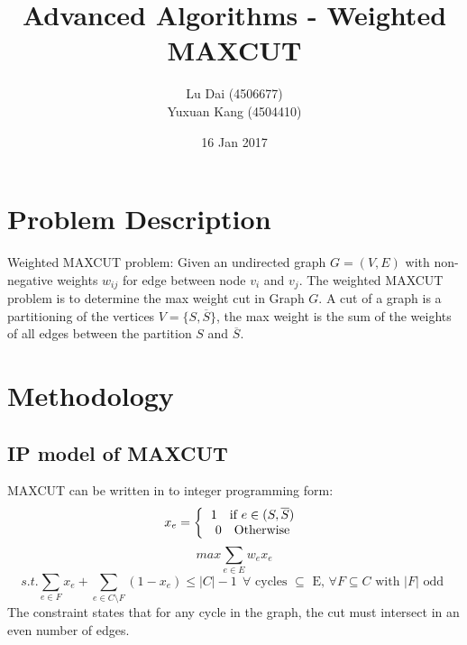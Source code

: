 \documentclass[11pt]{article}
\title{\textbf{Advanced Algorithms - Weighted MAXCUT}}
\author{Lu Dai (4506677)\\
		Yuxuan Kang (4504410)\\}
\date{16 Jan 2017}
\begin{document}
\maketitle

\section{Problem Description}
Weighted MAXCUT problem:
Given an undirected graph $G=(V,E)$ with non-negative weights $w_{ij}$ for edge between node $v_i$ and $v_j$. The weighted MAXCUT problem is to determine the max weight cut in Graph $G$. A cut of a graph is a partitioning of the vertices $V=\{S,\overline{S}\}$, the max weight is the sum of the weights of all edges between the partition $S$ and $\overline{S}$.

\section{Methodology}
\subsection{IP model of MAXCUT}
MAXCUT can be written in to integer programming form:
$$x_e=
\left \{
  \begin{tabular}{c}
  1 \  \ \text{if $e\in (S,\overline{S})$}\\
  0 \   \ \text{Otherwise}\\
  \end{tabular}\right.$$
$$max\sum_{e\in E}w_ex_e$$
$$s.t. \sum_{e\in F}x_e+\sum_{e\in C\setminus F}(1-x_e)\leq |C|-1\       \ \textrm{$\forall$ cycles $\subseteq$ E, $\forall F \subseteq C$ with $|F|$ odd }$$
The constraint states that for any cycle in the graph, the cut must intersect in an even number of edges.
\end{document}
